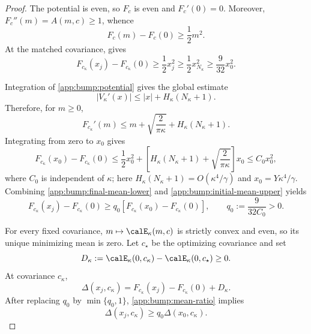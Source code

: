 \begin{proof}
The potential is even, so \(F_c\) is even and \(F_c'(0)=0\).  Moreover,
\(F_c''(m)=A(m,c)\geq1\), whence
\begin{equation}
\label{app:bump:smoothed-lower}
    F_c(m)-F_c(0)\geq\frac12m^2.
\end{equation}
At the matched covariance,
 gives
\begin{equation}
\label{app:bump:final-mean-lower}
    F_{c_\kappa}(x_j)-F_{c_\kappa}(0)
    \geq\frac12x_j^2
    \geq\frac12x_{N_\kappa}^2
    \geq\frac9{32}x_0^2.
\end{equation}

Integration of \eqref{app:bump:potential} gives the global estimate
\begin{equation}
\label{app:bump:global-score-bound}
    |V_\kappa'(x)|
    \leq |x|+H_\kappa(N_\kappa+1).
\end{equation}
Therefore, for \(m\geq0\),
\[
    F_{c_\kappa}'(m)
    \leq
    m+\sqrt{\frac{2}{\pi\kappa}}
      +H_\kappa(N_\kappa+1).
\]
Integrating from zero to \(x_0\) gives
\begin{equation}
\label{app:bump:initial-mean-upper}
    F_{c_\kappa}(x_0)-F_{c_\kappa}(0)
    \leq
    \frac12x_0^2
    +\left[
        H_\kappa(N_\kappa+1)
        +\sqrt{\frac{2}{\pi\kappa}}
    \right]x_0
    \leq C_0x_0^2,
\end{equation}
where \(C_0\) is independent of \(\kappa\); here
\(H_\kappa(N_\kappa+1)=O(\kappa^4/\gamma)\) and
\(x_0=Y\kappa^4/\gamma\).  Combining
\eqref{app:bump:final-mean-lower} and
\eqref{app:bump:initial-mean-upper} yields
\begin{equation}
\label{app:bump:mean-ratio}
    F_{c_\kappa}(x_j)-F_{c_\kappa}(0)
    \geq q_0
    [F_{c_\kappa}(x_0)-F_{c_\kappa}(0)],
    \qquad
    q_0:=\frac9{32C_0}>0.
\end{equation}

For every fixed covariance,
\(m\mapsto\calE_\kappa(m,c)\) is strictly convex and even, so its
unique minimizing mean is zero.  Let \(c_\star\) be the optimizing
covariance and set
\[
    D_\kappa
    :=\calE_\kappa(0,c_\kappa)-\calE_\kappa(0,c_\star)\geq0.
\]
At covariance \(c_\kappa\),
\[
    \Delta(x_j,c_\kappa)
    =F_{c_\kappa}(x_j)-F_{c_\kappa}(0)+D_\kappa.
\]
After replacing \(q_0\) by \(\min\{q_0,1\}\),
\eqref{app:bump:mean-ratio} implies
\begin{equation}
\label{app:bump:ideal-gap-ratio}
    \Delta(x_j,c_\kappa)\geq q_0\Delta(x_0,c_\kappa).
\end{equation}


\end{proof}
